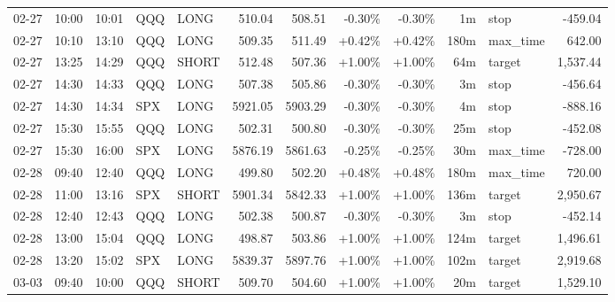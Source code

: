 \documentclass[11pt,a4paper,twoside]{article}
\begin{document}
\begin{center}
\begin{longtable}{>{\color{txtmain}}l l l l l r r r r r >{\color{txtmain}}l r}
02-27 & 10:00 & 10:01 & QQQ & LONG & 510.04 & 508.51 & \textcolor{lossred}{-0.30\%} & \textcolor{lossred}{-0.30\%} & 1m & stop & \textcolor{lossred}{-459.04} \\
02-27 & 10:10 & 13:10 & QQQ & LONG & 509.35 & 511.49 & \textcolor{wingreen}{+0.42\%} & \textcolor{wingreen}{+0.42\%} & 180m & max\_time & \textcolor{wingreen}{642.00} \\
02-27 & 13:25 & 14:29 & QQQ & SHORT & 512.48 & 507.36 & \textcolor{wingreen}{+1.00\%} & \textcolor{wingreen}{+1.00\%} & 64m & target & \textcolor{wingreen}{1,537.44} \\
02-27 & 14:30 & 14:33 & QQQ & LONG & 507.38 & 505.86 & \textcolor{lossred}{-0.30\%} & \textcolor{lossred}{-0.30\%} & 3m & stop & \textcolor{lossred}{-456.64} \\
02-27 & 14:30 & 14:34 & SPX & LONG & 5921.05 & 5903.29 & \textcolor{lossred}{-0.30\%} & \textcolor{lossred}{-0.30\%} & 4m & stop & \textcolor{lossred}{-888.16} \\
02-27 & 15:30 & 15:55 & QQQ & LONG & 502.31 & 500.80 & \textcolor{lossred}{-0.30\%} & \textcolor{lossred}{-0.30\%} & 25m & stop & \textcolor{lossred}{-452.08} \\
02-27 & 15:30 & 16:00 & SPX & LONG & 5876.19 & 5861.63 & \textcolor{lossred}{-0.25\%} & \textcolor{lossred}{-0.25\%} & 30m & max\_time & \textcolor{lossred}{-728.00} \\
02-28 & 09:40 & 12:40 & QQQ & LONG & 499.80 & 502.20 & \textcolor{wingreen}{+0.48\%} & \textcolor{wingreen}{+0.48\%} & 180m & max\_time & \textcolor{wingreen}{720.00} \\
02-28 & 11:00 & 13:16 & SPX & SHORT & 5901.34 & 5842.33 & \textcolor{wingreen}{+1.00\%} & \textcolor{wingreen}{+1.00\%} & 136m & target & \textcolor{wingreen}{2,950.67} \\
02-28 & 12:40 & 12:43 & QQQ & LONG & 502.38 & 500.87 & \textcolor{lossred}{-0.30\%} & \textcolor{lossred}{-0.30\%} & 3m & stop & \textcolor{lossred}{-452.14} \\
02-28 & 13:00 & 15:04 & QQQ & LONG & 498.87 & 503.86 & \textcolor{wingreen}{+1.00\%} & \textcolor{wingreen}{+1.00\%} & 124m & target & \textcolor{wingreen}{1,496.61} \\
02-28 & 13:20 & 15:02 & SPX & LONG & 5839.37 & 5897.76 & \textcolor{wingreen}{+1.00\%} & \textcolor{wingreen}{+1.00\%} & 102m & target & \textcolor{wingreen}{2,919.68} \\
03-03 & 09:40 & 10:00 & QQQ & SHORT & 509.70 & 504.60 & \textcolor{wingreen}{+1.00\%} & \textcolor{wingreen}{+1.00\%} & 20m & target & \textcolor{wingreen}{1,529.10} \\

\end{longtable}
\end{center}
\end{document}
